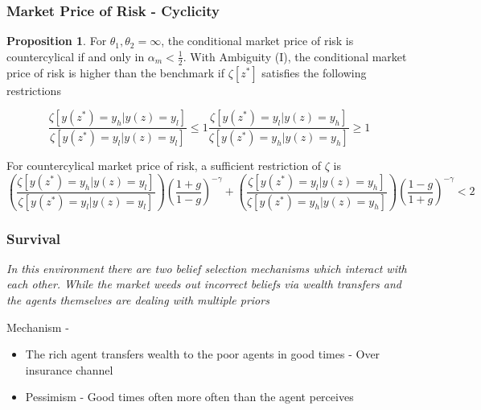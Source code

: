 \documentclass{beamer}
\theoremstyle{definition}
\newtheorem{proposition}{Proposition}%
\begin{document}
\begin{frame}
\frametitle{Market Price of Risk - Cyclicity}
\begin{proposition}
\label{propo-7}
For $\theta_1,\theta_2=\infty$, the conditional market price of risk is countercylical if and only in $\alpha_m < \frac{1}{2}$. With Ambiguity (I), the conditional market price of risk is higher than the benchmark if $\zeta[z^*]$ satisfies the following restrictions

\begin{subequations}
\label{eq:mprgreaterthanbenchmarkcondition}
\begin{equation}
	\frac{\zeta[y(z^*)=y_h|y(z)=y_l]}{\zeta[y(z^*)=y_l|y(z)=y_l]} \leq 1
\end{equation}
\begin{equation}
	\frac{\zeta[y(z^*)=y_l|y(z)=y_h]}{\zeta[y(z^*)=y_h|y(z)=y_h]} \geq 1
\end{equation}
\end{subequations}

For countercylical market price of risk, a sufficient restriction of $\zeta$ is
\tiny
\begin{equation}
\label{eq:countercylicalmprcondition}
\left(\frac{\zeta[y(z^*)=y_h|y(z)=y_l]}{\zeta[y(z^*)=y_l|y(z)=y_l]}\right)\left(\frac{1+g}{1-g}\right)^{-\gamma}+ \left(\frac{\zeta[y(z^*)=y_l|y(z)=y_h]}{\zeta[y(z^*)=y_h|y(z)=y_h]}\right)\left(\frac{1-g}{1+g}\right)^{-\gamma} <2
\end{equation}
\normalsize
\end{proposition}
\end{frame}

\begin{frame}
\frametitle{Survival}
\emph{In this environment there are two belief selection mechanisms which interact with each other. While the market weeds out incorrect beliefs via wealth transfers and the agents themselves are dealing with multiple priors}

Mechanism - 
\begin{itemize}
\item The rich agent transfers wealth to the poor agents in good times
  - Over insurance channel
\item Pessimism  - Good times often more often than the agent
  perceives
\end{itemize}



\end{frame}
\end{document}

